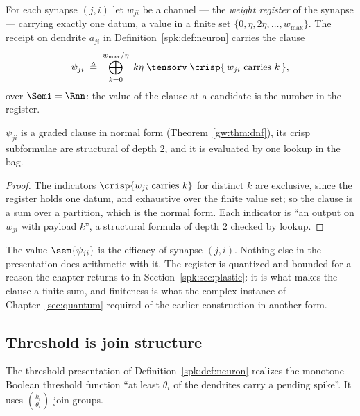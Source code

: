 \begin{definition}
\label{spk:def:keys}
For each synapse $(j,i)$ let $w_{ji}$ be a channel --- the \emph{weight register} of the
synapse --- carrying exactly one datum, a value in a finite set
$\{0, \eta, 2\eta, \ldots, w_{\max}\}$. The receipt on dendrite $a_{ji}$ in
Definition~\ref{spk:def:neuron} carries the clause
\[
  \psi_{ji} \;\triangleq\; \bigoplus_{k=0}^{w_{\max}/\eta} \; k\eta \;\tensorv\;
  \crisp{\,w_{ji}\ \text{carries}\ k\,},
\]
over $\Semi = \Rnn$: the value of the clause at a candidate is the number in the
register.
\end{definition}

\begin{proposition}
\label{spk:prop:admissible}
$\psi_{ji}$ is a graded clause in normal form (Theorem~\ref{gw:thm:dnf}), its crisp
subformulae are structural of depth $2$, and it is evaluated by one lookup in the bag.
\end{proposition}

\begin{proof}
The indicators $\crisp{w_{ji}\ \text{carries}\ k}$ for distinct $k$ are exclusive, since
the register holds one datum, and exhaustive over the finite value set; so the clause is
a sum over a partition, which is the normal form. Each indicator is ``an output on
$w_{ji}$ with payload $k$'', a structural formula of depth $2$ checked by lookup.
\end{proof}

The value $\sem{\psi_{ji}}$ is the efficacy of synapse $(j,i)$. Nothing else in the
presentation does arithmetic with it. The register is quantized and bounded for a reason
the chapter returns to in Section~\ref{spk:sec:plastic}: it is what makes the clause a
finite sum, and finiteness is what the complex instance of Chapter~\ref{sec:quantum}
required of the earlier construction in another form.

\subsection{Threshold is join structure}

\begin{proposition}
\label{spk:prop:mcp}
The threshold presentation of Definition~\ref{spk:def:neuron} realizes the monotone
Boolean threshold function ``at least $\theta_i$ of the dendrites carry a pending
spike''. It uses $\binom{k_i}{\theta_i}$ join groups.
\end{proposition}

